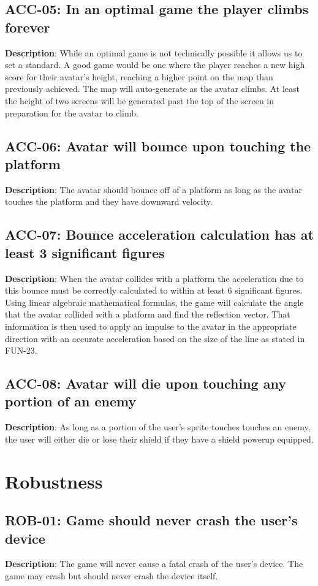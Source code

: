 \subsection{ACC-05: In an optimal game the player climbs forever}
\textbf{Description}: While an optimal game is not technically possible it
allows us to set a standard. A good game would be one where the player
reaches a new high score for their avatar\textquoteright{}s height,
reaching a higher point on the map than previously achieved. The map
will auto-generate as the avatar climbs. At least the height of two
screens will be generated past the top of the screen in preparation
for the avatar to climb.

\subsection{ACC-06: Avatar will bounce upon touching the platform}
\textbf{Description}: The avatar should bounce off of a platform as long as
the avatar touches the platform and they have downward velocity.

\subsection{ACC-07: Bounce acceleration calculation has at least 3 significant figures}
\textbf{Description}: When the avatar collides with a platform the acceleration
due to this bounce must be correctly calculated to within at least
6 significant figures. Using linear algebraic mathematical formulas,
the game will calculate the angle that the avatar collided with a
platform and find the reflection vector. That information is then
used to apply an impulse to the avatar in the appropriate direction
with an accurate acceleration based on the size of the line as stated
in FUN-23.

\subsection{ACC-08: Avatar will die upon touching any portion of an enemy}
\textbf{Description}: As long as a portion of the user\textquoteright{}s sprite
touches touches an enemy, the user will either die or lose their shield
if they have a shield powerup equipped.

\section{Robustness}

\subsection{ROB-01: Game should never crash the user\textquoteright{}s device}
\textbf{Description}: The game will never cause a fatal crash of the user\textquoteright{}s
device. The game may crash but should never crash the device itself.

